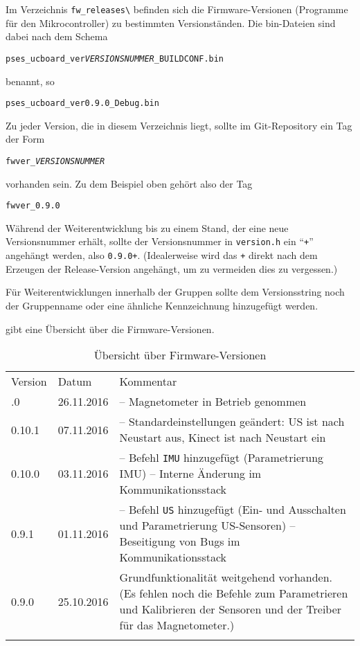 Im Verzeichnis \verb|fw_releases\| befinden sich die Firmware-Versionen (Programme für den Mikrocontroller) zu bestimmten Versionständen. Die bin-Dateien sind dabei nach dem Schema
\begin{center}
	\texttt{pses\_ucboard\_ver\textit{VERSIONSNUMMER}\_\texttt{BUILDCONF}.bin}
\end{center}
benannt, so \zB
\begin{center}
	\texttt{pses\_ucboard\_ver0.9.0\_Debug.bin}
\end{center}

Zu jeder Version, die in diesem Verzeichnis liegt, sollte im Git-Repository ein Tag der Form
\begin{center}
	\texttt{fwver\_\textit{VERSIONSNUMMER}}
\end{center}
vorhanden sein. Zu dem Beispiel oben gehört also der Tag
\begin{center}
	\texttt{fwver\_0.9.0}
\end{center}

Während der Weiterentwicklung bis zu einem Stand, der eine neue Versionsnummer erhält, sollte der Versionsnummer in \verb|version.h| ein "`\verb|+|"' angehängt werden, also \zB \verb|0.9.0+|. (Idealerweise wird das \verb|+| direkt nach dem Erzeugen der Release-Version angehängt, um zu vermeiden dies zu vergessen.)

Für Weiterentwicklungen innerhalb der Gruppen sollte dem Versionsstring noch der Gruppenname oder eine ähnliche Kennzeichnung hinzugefügt werden.


 gibt eine Übersicht über die Firmware-Versionen.

\begin{table}[htbp]%
	\centering
	\caption{Übersicht über Firmware-Versionen}
	\label{tab:repo:fw_versions}
	\begin{tabular}{llp{10cm}}
		\mytoprule
		Version & Datum & Kommentar \\
		\mymidrule
		0.11.0
			& 26.11.2016
			& -- Magnetometer in Betrieb genommen \\
		0.10.1
			& 07.11.2016
			& -- Standardeinstellungen geändert: US ist nach Neustart aus, Kinect ist nach Neustart ein \\
		0.10.0
			& 03.11.2016
			& -- Befehl \verb|IMU| hinzugefügt (Parametrierung IMU) \newline
				-- Interne Änderung im Kommunikationsstack \\
		0.9.1
			& 01.11.2016
			& -- Befehl \verb|US| hinzugefügt (Ein- und Ausschalten und Parametrierung US-Sensoren) \newline
				-- Beseitigung von Bugs im Kommunikationsstack \\
		0.9.0
			& 25.10.2016
			& Grundfunktionalität weitgehend vorhanden. (Es fehlen noch die Befehle zum Parametrieren und Kalibrieren der Sensoren und der Treiber für das Magnetometer.) \\
		\mybottomrule
	\end{tabular}
\end{table}



